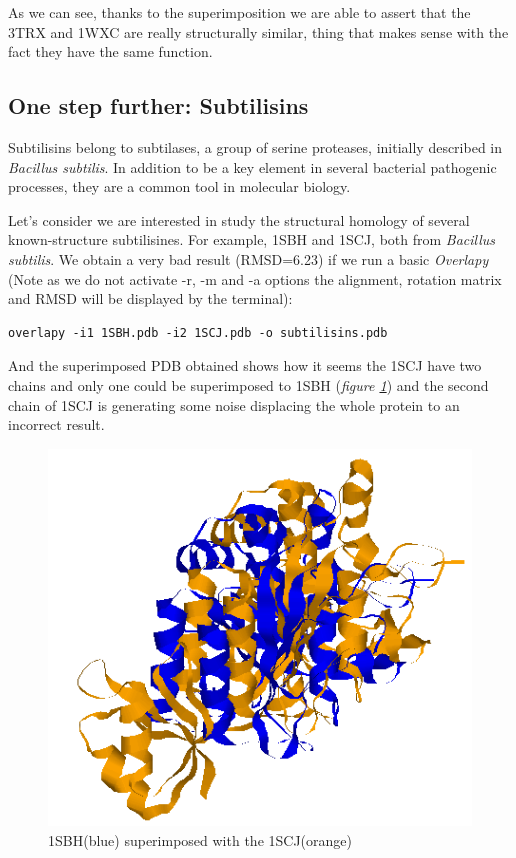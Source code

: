 \documentclass{article}
\begin{document}
As we can see, thanks to the superimposition we are able to assert that the 3TRX and 1WXC are really structurally similar, thing that makes sense with the fact they have the same function. 

\pagebreak

\subsection*{\color{gray}One step further: Subtilisins}
Subtilisins belong to subtilases, a group of serine proteases, initially described in \textit{Bacillus subtilis}. In addition to be a key element in several bacterial pathogenic processes, they are a common tool in molecular biology\cite{21}.

Let's consider we are interested in study the structural homology of several known-structure subtilisines. For example, 1SBH and 1SCJ, both from \textit{Bacillus subtilis}. We obtain a very bad result (RMSD=6.23) if we run a basic \textit{Overlapy} (Note as we do not activate -r, -m and -a options the alignment, rotation matrix and RMSD will be displayed by the terminal):

\begin{lstlisting}
overlapy -i1 1SBH.pdb -i2 1SCJ.pdb -o subtilisins.pdb
\end{lstlisting}

And the superimposed PDB obtained shows how it seems the 1SCJ have two chains and only one could be superimposed to 1SBH (\textit{figure \ref{fig:subti}}) and the second chain of 1SCJ is generating some noise displacing the whole protein to an incorrect result.

\begin{figure}[!h]
	\centering
	\includegraphics[scale=0.6]{images/subti1.png}
	\caption{1SBH(blue) superimposed with the 1SCJ(orange)}
	\label{fig:subti}
\end{figure}
\end{document}
